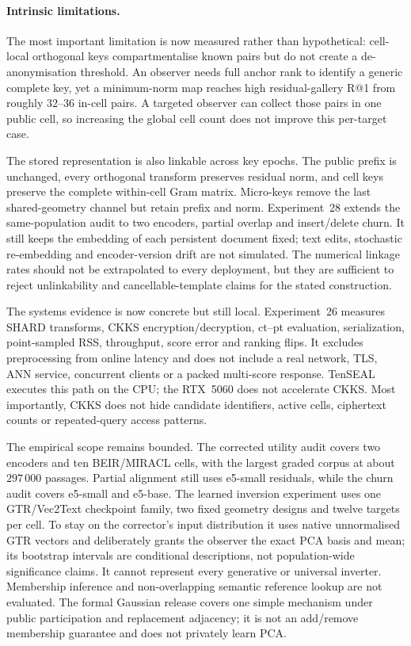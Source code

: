 \documentclass[11pt,a4paper]{article}
\begin{document}
\paragraph{Intrinsic limitations.}
The most important limitation is now measured rather than hypothetical:
cell-local orthogonal keys compartmentalise known pairs but do not create a
de-anonymisation threshold. An observer needs full anchor rank to identify a
generic complete key, yet a minimum-norm map reaches high residual-gallery
R@1 from roughly $32$--$36$ in-cell pairs. A targeted observer can collect
those pairs in one public cell, so increasing the global cell count does not
improve this per-target case.

The stored representation is also linkable across key epochs. The public
prefix is unchanged, every orthogonal transform preserves residual norm, and
cell keys preserve the complete within-cell Gram matrix. Micro-keys remove the
last shared-geometry channel but retain prefix and norm. Experiment~28 extends
the same-population audit to two encoders, partial overlap and insert/delete
churn. It still keeps the embedding of each persistent document fixed; text
edits, stochastic re-embedding and encoder-version drift are not simulated.
The numerical linkage rates should not be extrapolated to every deployment,
but they are sufficient to reject unlinkability and cancellable-template
claims for the stated construction.

The systems evidence is now concrete but still local. Experiment~26 measures
SHARD transforms, CKKS encryption/decryption, ct--pt evaluation,
serialization, point-sampled RSS, throughput, score error and ranking flips.
It excludes preprocessing from online latency and does not include a real
network, TLS, ANN service, concurrent clients or a packed multi-score response.
TenSEAL executes this path on the CPU; the RTX~5060 does not accelerate CKKS.
Most importantly, CKKS does not hide candidate identifiers, active cells,
ciphertext counts or repeated-query access patterns.

The empirical scope remains bounded. The corrected utility audit covers two
encoders and ten BEIR/MIRACL cells, with the largest graded corpus at about
$297\,000$ passages. Partial alignment still uses e5-small residuals, while
the churn audit covers e5-small and e5-base. The learned inversion experiment
uses one GTR/Vec2Text checkpoint family, two fixed geometry designs and twelve
targets per cell. To stay on the corrector's input distribution it uses native
unnormalised GTR vectors and deliberately grants the observer the exact PCA
basis and mean; its bootstrap intervals are conditional descriptions, not
population-wide significance claims. It cannot represent every generative or
universal inverter. Membership inference and non-overlapping semantic
reference lookup are not evaluated. The formal Gaussian release covers one
simple mechanism under public participation and replacement adjacency; it is
not an add/remove membership guarantee and does not privately learn PCA.
\end{document}
